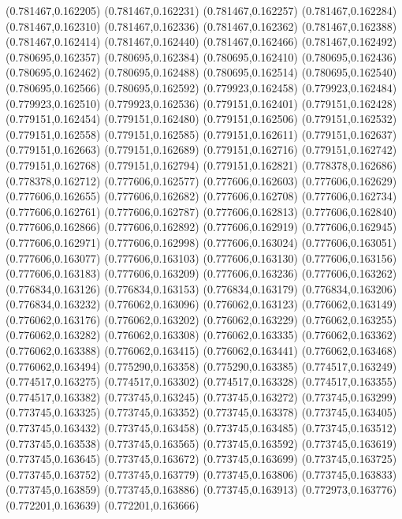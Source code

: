 (0.781467,0.162205)
(0.781467,0.162231)
(0.781467,0.162257)
(0.781467,0.162284)
(0.781467,0.162310)
(0.781467,0.162336)
(0.781467,0.162362)
(0.781467,0.162388)
(0.781467,0.162414)
(0.781467,0.162440)
(0.781467,0.162466)
(0.781467,0.162492)
(0.780695,0.162357)
(0.780695,0.162384)
(0.780695,0.162410)
(0.780695,0.162436)
(0.780695,0.162462)
(0.780695,0.162488)
(0.780695,0.162514)
(0.780695,0.162540)
(0.780695,0.162566)
(0.780695,0.162592)
(0.779923,0.162458)
(0.779923,0.162484)
(0.779923,0.162510)
(0.779923,0.162536)
(0.779151,0.162401)
(0.779151,0.162428)
(0.779151,0.162454)
(0.779151,0.162480)
(0.779151,0.162506)
(0.779151,0.162532)
(0.779151,0.162558)
(0.779151,0.162585)
(0.779151,0.162611)
(0.779151,0.162637)
(0.779151,0.162663)
(0.779151,0.162689)
(0.779151,0.162716)
(0.779151,0.162742)
(0.779151,0.162768)
(0.779151,0.162794)
(0.779151,0.162821)
(0.778378,0.162686)
(0.778378,0.162712)
(0.777606,0.162577)
(0.777606,0.162603)
(0.777606,0.162629)
(0.777606,0.162655)
(0.777606,0.162682)
(0.777606,0.162708)
(0.777606,0.162734)
(0.777606,0.162761)
(0.777606,0.162787)
(0.777606,0.162813)
(0.777606,0.162840)
(0.777606,0.162866)
(0.777606,0.162892)
(0.777606,0.162919)
(0.777606,0.162945)
(0.777606,0.162971)
(0.777606,0.162998)
(0.777606,0.163024)
(0.777606,0.163051)
(0.777606,0.163077)
(0.777606,0.163103)
(0.777606,0.163130)
(0.777606,0.163156)
(0.777606,0.163183)
(0.777606,0.163209)
(0.777606,0.163236)
(0.777606,0.163262)
(0.776834,0.163126)
(0.776834,0.163153)
(0.776834,0.163179)
(0.776834,0.163206)
(0.776834,0.163232)
(0.776062,0.163096)
(0.776062,0.163123)
(0.776062,0.163149)
(0.776062,0.163176)
(0.776062,0.163202)
(0.776062,0.163229)
(0.776062,0.163255)
(0.776062,0.163282)
(0.776062,0.163308)
(0.776062,0.163335)
(0.776062,0.163362)
(0.776062,0.163388)
(0.776062,0.163415)
(0.776062,0.163441)
(0.776062,0.163468)
(0.776062,0.163494)
(0.775290,0.163358)
(0.775290,0.163385)
(0.774517,0.163249)
(0.774517,0.163275)
(0.774517,0.163302)
(0.774517,0.163328)
(0.774517,0.163355)
(0.774517,0.163382)
(0.773745,0.163245)
(0.773745,0.163272)
(0.773745,0.163299)
(0.773745,0.163325)
(0.773745,0.163352)
(0.773745,0.163378)
(0.773745,0.163405)
(0.773745,0.163432)
(0.773745,0.163458)
(0.773745,0.163485)
(0.773745,0.163512)
(0.773745,0.163538)
(0.773745,0.163565)
(0.773745,0.163592)
(0.773745,0.163619)
(0.773745,0.163645)
(0.773745,0.163672)
(0.773745,0.163699)
(0.773745,0.163725)
(0.773745,0.163752)
(0.773745,0.163779)
(0.773745,0.163806)
(0.773745,0.163833)
(0.773745,0.163859)
(0.773745,0.163886)
(0.773745,0.163913)
(0.772973,0.163776)
(0.772201,0.163639)
(0.772201,0.163666)

